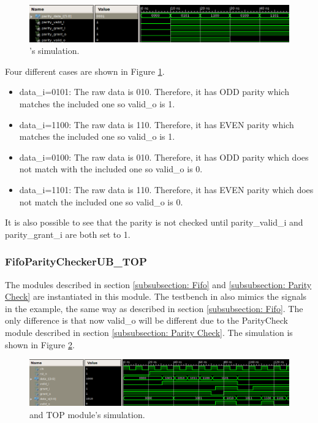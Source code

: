 \documentclass[12pt]{article}
\begin{document}
\begin{figure}[ht]
\centering
\includegraphics[width=15cm]{images/parity-check-simulation}
\caption{\label{fig: ParityCheck simulation} \paritycheck's simulation.}
\end{figure}

Four different cases are shown in Figure \ref{fig: ParityCheck simulation}.
\begin{itemize}
	\item data\_i=0101: The raw data is 010.  Therefore, it has ODD parity which matches the included one so valid\_o is 1.
	\item data\_i=1100: The raw data is 110.  Therefore, it has EVEN parity which matches the included one so valid\_o is 1.
	\item data\_i=0100: The raw data is 010.  Therefore, it has ODD parity which does not match with the included one so valid\_o is 0.
	\item data\_i=1101: The raw data is 110.  Therefore, it has EVEN parity which does not match the included one so valid\_o is 0.
\end{itemize}

It is also possible to see that the parity is not checked until parity\_valid\_i and parity\_grant\_i are both set to 1.

\subsubsection{FifoParityCheckerUB\_TOP}
The modules described in section \ref{subsubsection: Fifo} and \ref{subsubsection: Parity Check} are instantiated in this module.  The testbench in also mimics the signals in the example, the same way as described in section \ref{subsubsection: Fifo}.  The only difference is that now valid\_o will be different due to the ParityCheck module described in section \ref{subsubsection: Parity Check}.  The simulation is shown in Figure \ref{fig: FIFO and Parity TOP simulation}.

\begin{figure}[ht]
\centering
\includegraphics[width=15cm]{images/fifo-paritycheck-TOP-simulation}
\caption{\label{fig: FIFO and Parity TOP simulation}\fifo and \paritycheck TOP module's simulation.}
\end{figure}
\end{document}
